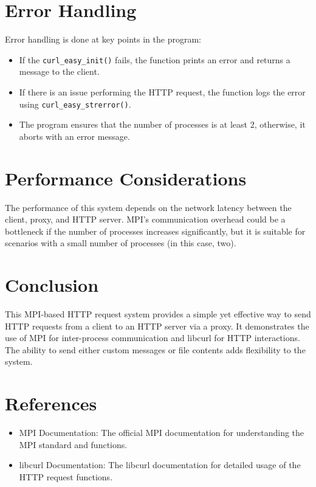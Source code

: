 \documentclass[a4paper,12pt]{article}
\begin{document}
\section{Error Handling}
Error handling is done at key points in the program:
\begin{itemize}
    \item If the \texttt{curl\_easy\_init()} fails, the function prints an error and returns a message to the client.
    \item If there is an issue performing the HTTP request, the function logs the error using \texttt{curl\_easy\_strerror()}.
    \item The program ensures that the number of processes is at least 2, otherwise, it aborts with an error message.
\end{itemize}

\section{Performance Considerations}
The performance of this system depends on the network latency between the client, proxy, and HTTP server. MPI's communication overhead could be a bottleneck if the number of processes increases significantly, but it is suitable for scenarios with a small number of processes (in this case, two).

\section{Conclusion}
This MPI-based HTTP request system provides a simple yet effective way to send HTTP requests from a client to an HTTP server via a proxy. It demonstrates the use of MPI for inter-process communication and libcurl for HTTP interactions. The ability to send either custom messages or file contents adds flexibility to the system.

\section{References}
\begin{itemize}
    \item MPI Documentation: The official MPI documentation for understanding the MPI standard and functions.
    \item libcurl Documentation: The libcurl documentation for detailed usage of the HTTP request functions.
\end{itemize}
\end{document}
